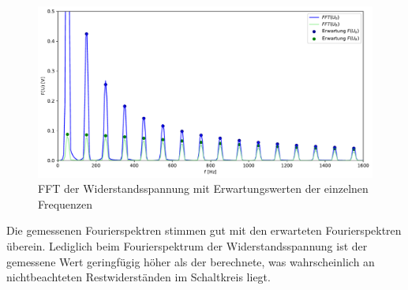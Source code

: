 \documentclass[12pt,a4paper]{article}
\begin{document}
\begin{figure}[H]
	\centering
	\includegraphics[width=1\textwidth]{Python/Fourier_UR_Erwartung.pdf}
	\caption{FFT der Widerstandsspannung mit Erwartungswerten der einzelnen Frequenzen}
	\label{HT_Erwartung_R}
\end{figure}
Die gemessenen Fourierspektren stimmen gut mit den erwarteten Fourierspektren überein. Lediglich beim Fourierspektrum der Widerstandsspannung ist der gemessene Wert geringfügig höher als der berechnete, was wahrscheinlich an nichtbeachteten Restwiderständen im Schaltkreis liegt. 
\end{document}
